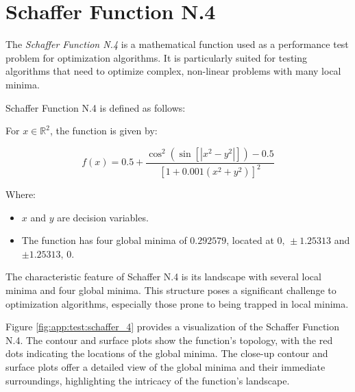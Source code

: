 \section{Schaffer Function N.4}
  The \emph{Schaffer Function N.4} is a mathematical function used as a 
  performance test problem for optimization algorithms.
  It is particularly suited for testing algorithms that need to optimize 
  complex, non-linear problems with many local minima.

  \begin{definition}
    Schaffer Function N.4 is defined as follows:

    For \(x \in \mathbb{R}^2\), the function is given by:

    \[
      f(x) = 0.5 
        + \frac{
            \cos^2\left(\sin\left[\left|x^2 - y^2\right|\right]\right) - 0.5
          }{
            \left[1 + 0.001\left(x^2 + y^2\right)\right]^2
          }
    \]

    Where:
    \begin{itemize}
      \item \(x\) and \(y\) are decision variables.
      \item The function has four global minima of \(0.292579\), located at 
        \(0,\, \pm 1.25313\) and \(\pm 1.25313,\, 0\).
    \end{itemize}
  \end{definition}

  The characteristic feature of Schaffer N.4 is its landscape with several local minima and four global minima.
  This structure poses a significant challenge to optimization algorithms, especially those prone to being trapped in local minima.


  Figure \ref{fig:app:test:schaffer_4} provides a visualization of the Schaffer 
  Function N.4.
  The contour and surface plots show the function's topology, with the red dots 
  indicating the locations of the global minima.
  The close-up contour and surface plots offer a detailed view of the global 
  minima and their immediate surroundings, highlighting the intricacy of the 
  function's landscape.


